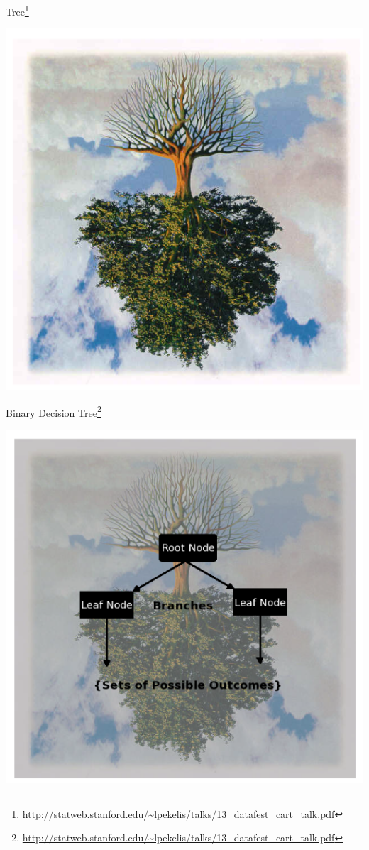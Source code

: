 \documentclass{beamer}
\newcommand{\furl}[1]{{\footnote{\url{#1}}}}
\begin{document}
\begin{frame}{Tree\furl{http://statweb.stanford.edu/~lpekelis/talks/13_datafest_cart_talk.pdf}}
    \begin{center}
        \includegraphics[scale=0.4]{tree.png}
    \end{center}
\end{frame}
\begin{frame}{Binary Decision Tree\furl{http://statweb.stanford.edu/~lpekelis/talks/13_datafest_cart_talk.pdf}}
    \begin{center}
        \includegraphics[scale=0.4]{binaryDTree.png}
    \end{center}
\end{frame}
\end{document}
